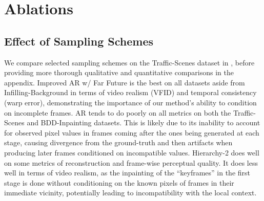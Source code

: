 \section{Ablations}

\subsection{Effect of Sampling Schemes}
We compare selected sampling schemes on the Traffic-Scenes dataset in , before providing more thorough qualitative and quantitative comparisons in the appendix. Improved AR w/ Far Future is the best on all datasets aside from Infilling-Background in terms of video realism (VFID) and temporal consistency (warp error), demonstrating the importance of our method's ability to condition on incomplete frames. AR tends to do poorly on all metrics on both the Traffic-Scenes and BDD-Inpainting datasets. This is likely due to its inability to account for observed pixel values in frames coming after the ones being generated at each stage, causing divergence from the ground-truth and then artifacts when producing later frames conditioned on incompatible values. Hierarchy-2 does well on some metrics of reconstruction and frame-wise perceptual quality. It does less well in terms of video realism, as the inpainting of the ``keyframes'' in the first stage is done without conditioning on the known pixels of frames in their immediate vicinity, potentially leading to incompatibility with the local context.
\begin{table}[t]
\centering
\caption{Effect of sampling schemes, measured on the Traffic-Scenes test set.}
\label{table:samplingschemes}
\end{table}

